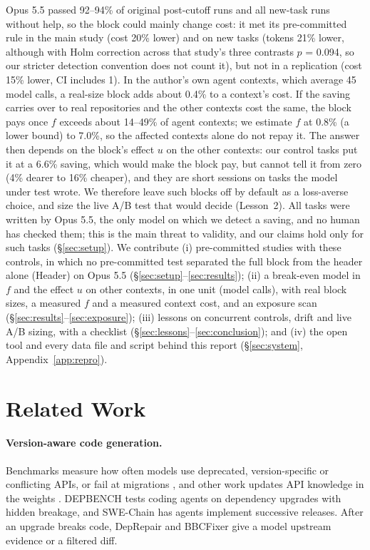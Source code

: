 \documentclass[11pt]{article}
\newcommand{\aHeader}{\textsf{Header}\xspace}
\begin{document}
Opus 5.5 passed 92--94\% of original post-cutoff runs and all new-task runs without help, so the block could mainly change cost: it met its pre-committed rule in the main study (cost 20\% lower) and on new tasks (tokens 21\% lower, although with Holm correction across that study's three contrasts $p$ = 0.094, so our stricter detection convention does not count it), but not in a replication (cost 15\% lower, CI includes 1).
In the author's own agent contexts, which average 45 model calls, a real-size block adds about 0.4\% to a context's cost.
If the saving carries over to real repositories and the other contexts cost the same, the block pays once $f$ exceeds about 14--49\% of agent contexts; we estimate $f$ at 0.8\% (a lower bound) to 7.0\%, so the affected contexts alone do not repay it.
The answer then depends on the block's effect $u$ on the other contexts: our control tasks put it at a 6.6\% saving, which would make the block pay, but cannot tell it from zero (4\% dearer to 16\% cheaper), and they are short sessions on tasks the model under test wrote.
We therefore leave such blocks off by default as a loss-averse choice, and size the live A/B test that would decide (Lesson~2).
All tasks were written by Opus 5.5, the only model on which we detect a saving, and no human has checked them; this is the main threat to validity, and our claims hold only for such tasks (\S\ref{sec:setup}).
We contribute (i) pre-committed studies with these controls, in which no pre-committed test separated the full block from the header alone (\aHeader) on Opus 5.5 (\S\ref{sec:setup}--\ref{sec:results}); (ii) a break-even model in $f$ and the effect $u$ on other contexts, in one unit (model calls), with real block sizes, a measured $f$ and a measured context cost, and an exposure scan (\S\ref{sec:results}--\ref{sec:exposure}); (iii) lessons on concurrent controls, drift and live A/B sizing, with a checklist (\S\ref{sec:lessons}--\ref{sec:conclusion}); and (iv) the open tool and every data file and script behind this report (\S\ref{sec:system}, Appendix~\ref{app:repro}).

\section{Related Work}

\paragraph{Version-aware code generation.}
Benchmarks measure how often models use deprecated, version-specific or conflicting APIs, or fail at migrations \citep{wang2025llmslibraryevolution,wu2024versicode,kuhar2025libevolutioneval,islah2024gitchameleon,misra2026gitchameleon2,ashik2026llmslag,cipollone2026libevobench,cheng2025codemenv}, and other work updates API knowledge in the weights \citep{liu2024codeupdatearena,lin2026cannon,liu2026unlearningdeprecated,gu2026mindthegaps,tran2026cure,wu2025recode}.
DEPBENCH \citep{luo2026depbench} tests coding agents on dependency upgrades with hidden breakage, and SWE-Chain \citep{lam2026swechain} has agents implement successive releases.
After an upgrade breaks code, DepRepair \citep{yang2026deprepair} and BBCFixer \citep{chen2026whobrokeme} give a model upstream evidence or a filtered diff.
\end{document}
